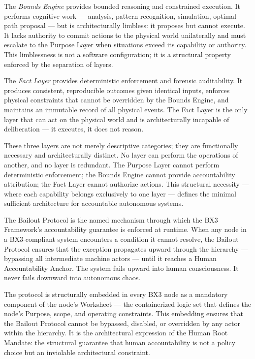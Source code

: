 The \textit{Bounds Engine} provides bounded reasoning and constrained execution. It performs cognitive work — analysis, pattern recognition, simulation, optimal path proposal — but is architecturally limbless: it proposes but cannot execute. It lacks authority to commit actions to the physical world unilaterally and must escalate to the Purpose Layer when situations exceed its capability or authority. This limblessness is not a software configuration; it is a structural property enforced by the separation of layers.

The \textit{Fact Layer} provides deterministic enforcement and forensic auditability. It produces consistent, reproducible outcomes given identical inputs, enforces physical constraints that cannot be overridden by the Bounds Engine, and maintains an immutable record of all physical events. The Fact Layer is the only layer that can act on the physical world and is architecturally incapable of deliberation — it executes, it does not reason.

These three layers are not merely descriptive categories; they are functionally necessary and architecturally distinct. No layer can perform the operations of another, and no layer is redundant. The Purpose Layer cannot perform deterministic enforcement; the Bounds Engine cannot provide accountability attribution; the Fact Layer cannot authorize actions. This structural necessity — where each capability belongs exclusively to one layer — defines the minimal sufficient architecture for accountable autonomous systems.

The Bailout Protocol is the named mechanism through which the BX3 Framework's accountability guarantee is enforced at runtime. When any node in a BX3-compliant system encounters a condition it cannot resolve, the Bailout Protocol ensures that the exception propagates upward through the hierarchy — bypassing all intermediate machine actors — until it reaches a Human Accountability Anchor. The system fails upward into human consciousness. It never fails downward into autonomous chaos.

The protocol is structurally embedded in every BX3 node as a mandatory component of the node's Worksheet — the containerized logic set that defines the node's Purpose, scope, and operating constraints. This embedding ensures that the Bailout Protocol cannot be bypassed, disabled, or overridden by any actor within the hierarchy. It is the architectural expression of the Human Root Mandate: the structural guarantee that human accountability is not a policy choice but an inviolable architectural constraint.
